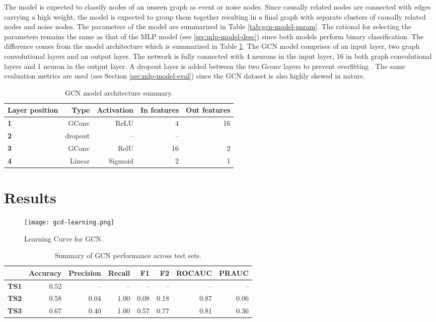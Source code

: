 The model is expected to classify nodes of an unseen graph as event or
noise nodes. Since causally related nodes are connected with edges
carrying a high weight, the model is expected to group them together
resulting in a final graph with separate clusters of causally related
nodes and noise nodes. The parameters of the model are summarized in
Table \ref{tab:gcn-model-param}. The rational for selecting the
parameters remains the same as that of the MLP model (see
\ref{sec:mlp-model-desc}) since both models perform binary
classification. The difference comes from the model architecture which
is summarized in Table \ref{tab:gcn-model-arch}. The GCN model
comprises of an input layer, two graph convolutional layers and an
output layer. The network is fully connected with 4 neurons in the
input layer, 16 in both graph convolutional layers and 1 neuron in the
output layer. A dropout layer is added between the two Gconv layers to
prevent overfitting \cite{srivastava14dropout}. The same evaluation
metrics are used (see Section \ref{sec:mlp-model-eval}) since the GCN
dataset is also highly skewed in nature.

\begin{table}
  \centering
  \caption{GCN model architecture summary.}
  \begin{tabular}{lrrrr}
    \hline
    Layer position & Type & Activation & In features & Out features \\
    \hline
    \textbf{1} & GConv & ReLU & 4 & 16 \\
    \textbf{2} & dropout & -- & -- \\
    \textbf{3} & GConv & RelU & 16 & 2 \\
    \textbf{4} & Linear & Sigmoid & 2 & 1 \\
    \hline
  \end{tabular}
  \label{tab:gcn-model-arch}
\end{table}

\section{Results}
\label{sec:gcd-disc}

\begin{figure}[htb]
  \centering
    \texttt{[image: gcd-learning.png]}
    \caption{Learning Curve for GCN.}
  \label{fig:gcn-learning}
\end{figure}

\begin{table}[htb]
  \centering
  \caption{Summary of GCN performance across test sets.}
  \begin{tabular}{lrrrrrrr}
    \hline
    & Accuracy & Precision & Recall & F1 & F2 & ROCAUC & PRAUC \\
    \hline
    \textbf{TS1} & 0.52 & -- & -- & -- & -- & -- & -- \\
    \textbf{TS2} & 0.58 & 0.04 & 1.00 & 0.08 & 0.18 & 0.87 & 0.06 \\
    \textbf{TS3} & 0.67 & 0.40 & 1.00 & 0.57 & 0.77 & 0.81 & 0.36 \\
    \hline
  \end{tabular}
  \label{tab:gcn-results}
\end{table}

